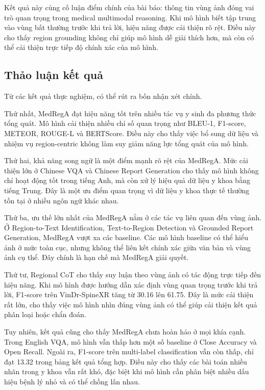 \documentclass[12pt,a4paper,oneside]{extarticle}
\begin{document}
Kết quả này củng cố luận điểm chính của bài báo: thông tin vùng ảnh đóng vai trò quan trọng trong medical multimodal reasoning. Khi mô hình biết tập trung vào vùng bất thường trước khi trả lời, hiệu năng được cải thiện rõ rệt. Điều này cho thấy region grounding không chỉ giúp mô hình dễ giải thích hơn, mà còn có thể cải thiện trực tiếp độ chính xác của mô hình.

\subsection{Thảo luận kết quả}

Từ các kết quả thực nghiệm, có thể rút ra bốn nhận xét chính.

Thứ nhất, MedRegA đạt hiệu năng tốt trên nhiều tác vụ y sinh đa phương thức tổng quát. Mô hình cải thiện nhiều chỉ số quan trọng như BLEU-1, F1-score, METEOR, ROUGE-L và BERTScore. Điều này cho thấy việc bổ sung dữ liệu và nhiệm vụ region-centric không làm suy giảm năng lực tổng quát của mô hình.

Thứ hai, khả năng song ngữ là một điểm mạnh rõ rệt của MedRegA. Mức cải thiện lớn ở Chinese VQA và Chinese Report Generation cho thấy mô hình không chỉ hoạt động tốt trong tiếng Anh, mà còn xử lý hiệu quả dữ liệu y khoa bằng tiếng Trung. Đây là một ưu điểm quan trọng vì dữ liệu y khoa thực tế thường tồn tại ở nhiều ngôn ngữ khác nhau.

Thứ ba, ưu thế lớn nhất của MedRegA nằm ở các tác vụ liên quan đến vùng ảnh. Ở Region-to-Text Identification, Text-to-Region Detection và Grounded Report Generation, MedRegA vượt xa các baseline. Các mô hình baseline có thể hiểu ảnh ở mức toàn cục, nhưng không thể liên kết chính xác giữa văn bản và vùng ảnh cụ thể. Đây chính là hạn chế mà MedRegA giải quyết.

Thứ tư, Regional CoT cho thấy suy luận theo vùng ảnh có tác động trực tiếp đến hiệu năng. Khi mô hình được hướng dẫn xác định vùng quan trọng trước khi trả lời, F1-score trên VinDr-SpineXR tăng từ 30.16 lên 61.75. Đây là mức cải thiện rất lớn, cho thấy việc mô hình nhìn đúng vùng ảnh có thể giúp cải thiện kết quả phân loại hoặc chẩn đoán.

Tuy nhiên, kết quả cũng cho thấy MedRegA chưa hoàn hảo ở mọi khía cạnh. Trong English VQA, mô hình vẫn thấp hơn một số baseline ở Close Accuracy và Open Recall. Ngoài ra, F1-score trên multi-label classification vẫn còn thấp, chỉ đạt 13.32 trong bảng kết quả tổng hợp. Điều này cho thấy các bài toán nhiều nhãn trong y khoa vẫn rất khó, đặc biệt khi mô hình cần phân biệt nhiều dấu hiệu bệnh lý nhỏ và có thể chồng lấn nhau.
\end{document}
